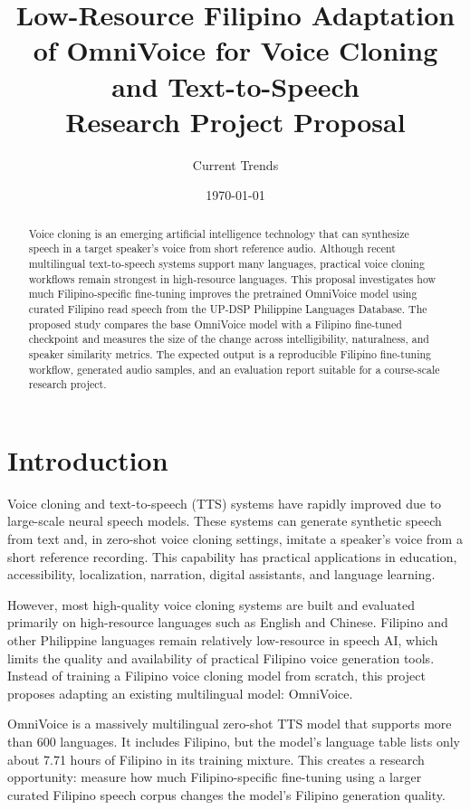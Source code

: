 \documentclass[11pt]{article}
\title{\textbf{Low-Resource Filipino Adaptation of OmniVoice for Voice Cloning and Text-to-Speech}\\
\large Research Project Proposal}
\author{Current Trends}
\date{\today}
\begin{document}
\maketitle

\begin{abstract}
Voice cloning is an emerging artificial intelligence technology that can synthesize speech in a target speaker's voice from short reference audio. Although recent multilingual text-to-speech systems support many languages, practical voice cloning workflows remain strongest in high-resource languages. This proposal investigates how much Filipino-specific fine-tuning improves the pretrained OmniVoice model using curated Filipino read speech from the UP-DSP Philippine Languages Database. The proposed study compares the base OmniVoice model with a Filipino fine-tuned checkpoint and measures the size of the change across intelligibility, naturalness, and speaker similarity metrics. The expected output is a reproducible Filipino fine-tuning workflow, generated audio samples, and an evaluation report suitable for a course-scale research project.
\end{abstract}

\section{Introduction}

Voice cloning and text-to-speech (TTS) systems have rapidly improved due to large-scale neural speech models. These systems can generate synthetic speech from text and, in zero-shot voice cloning settings, imitate a speaker's voice from a short reference recording. This capability has practical applications in education, accessibility, localization, narration, digital assistants, and language learning.

However, most high-quality voice cloning systems are built and evaluated primarily on high-resource languages such as English and Chinese. Filipino and other Philippine languages remain relatively low-resource in speech AI, which limits the quality and availability of practical Filipino voice generation tools. Instead of training a Filipino voice cloning model from scratch, this project proposes adapting an existing multilingual model: OmniVoice.

OmniVoice is a massively multilingual zero-shot TTS model that supports more than 600 languages. It includes Filipino, but the model's language table lists only about 7.71 hours of Filipino in its training mixture. This creates a research opportunity: measure how much Filipino-specific fine-tuning using a larger curated Filipino speech corpus changes the model's Filipino generation quality.
\end{document}
